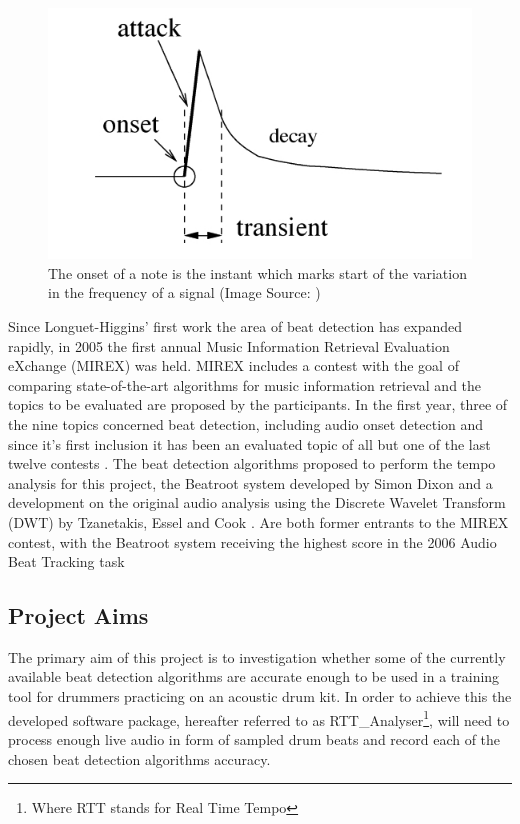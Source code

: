 \documentclass[a4paper, 11pt]{article}
\begin{document}
\begin{figure}[ht]
	\centering
	\includegraphics[scale=0.40]{Onset}
	\caption{The onset of a note is the instant which marks start of the variation in the frequency of a signal (Image Source: \cite{onset-tut})}
	\label{fig: Onset}
\end{figure}

Since Longuet-Higgins' first work the area of beat detection has expanded rapidly, in 2005 the first annual Music Information Retrieval Evaluation eXchange (MIREX) was held. MIREX includes a contest with the goal of comparing state-of-the-art algorithms for music information retrieval \cite{mirex-main} and the topics to be evaluated are proposed by the participants. In the first year, three of the nine topics concerned beat detection, including audio onset detection and since it's first inclusion it has been an evaluated topic of all but one of the last twelve contests \cite{mirex-onset}. The beat detection algorithms proposed to perform the tempo analysis for this project, the Beatroot system developed by Simon Dixon \cite{dixon1} and a development on the original audio analysis using the Discrete Wavelet Transform (DWT) by Tzanetakis, Essel and Cook \cite{tzane1}. Are both former entrants to the MIREX contest, with the Beatroot system receiving the highest score in the 2006 Audio Beat Tracking task \cite{mirex-06} 

\subsection{Project Aims}
The primary aim of this project is to investigation whether some of the currently available beat detection algorithms are accurate enough to be used in a training tool for drummers practicing on an acoustic drum kit. In order to achieve this the developed software package, hereafter referred to as  RTT\_Analyser\footnote{Where RTT stands for Real Time Tempo}, will need to process enough live audio in form of sampled drum beats and record each of the chosen beat detection algorithms accuracy. 
\end{document}
